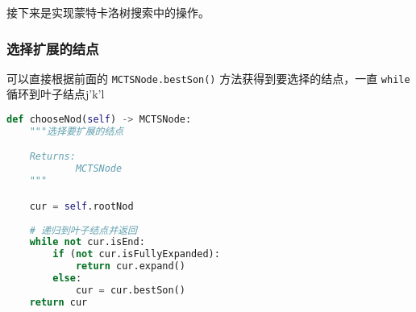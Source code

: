 接下来是实现蒙特卡洛树搜索中的操作。
\subsubsection{选择扩展的结点}
可以直接根据前面的 \verb`MCTSNode.bestSon()` 方法获得到要选择的结点，一直 \verb`while` 循环到叶子结点j'k'l
\begin{lstlisting}[language=python]
def chooseNod(self) -> MCTSNode:
    """选择要扩展的结点

    Returns:
            MCTSNode
    """

    cur = self.rootNod
    
    # 递归到叶子结点并返回
    while not cur.isEnd:
        if (not cur.isFullyExpanded):
            return cur.expand()
        else:
            cur = cur.bestSon()
    return cur
\end{lstlisting}
